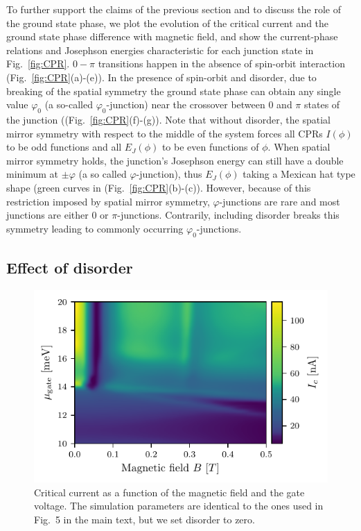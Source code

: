 To further support the claims of the previous section and to discuss the role of the ground state phase, we plot the evolution of the critical current and the ground state phase difference with magnetic field, and show the current-phase relations and Josephson energies characteristic for each junction state in Fig.~\ref{fig:CPR}.
$0-\pi$ transitions happen in the absence of spin-orbit interaction (Fig.~\ref{fig:CPR}(a)-(e)).
In the presence of spin-orbit and disorder, due to breaking of the spatial symmetry the ground state phase can obtain any single value $\varphi_0$ (a so-called $\varphi_0$-junction) near the crossover between $0$ and $\pi$ states of the junction ((Fig.~\ref{fig:CPR}(f)-(g)).
Note that without disorder, the spatial mirror symmetry with respect to the middle of the system forces all CPRs $I(\phi)$ to be odd functions and all $E_J(\phi)$ to be even functions of $\phi$.
When spatial mirror symmetry holds, the junction's Josephson energy can still have a double minimum at $\pm\varphi$ (a so called $\varphi$-junction), thus $E_J(\phi)$ taking a Mexican hat type shape (green curves in (Fig.~\ref{fig:CPR}(b)-(c)).
However, because of this restriction imposed by spatial mirror symmetry, $\varphi$-junctions are rare and most junctions are either 0 or $\pi$-junctions.
Contrarily, including disorder breaks this symmetry leading to commonly occurring $\varphi_0$-junctions.

\subsection{Effect of disorder}

\begin{figure}
\begin{center}
\centering
\includegraphics[width=0.7\columnwidth]{chapter_supercurrent/figures/sup_fig9.pdf}
\caption{Critical current as a function of the magnetic field and the gate voltage. The simulation parameters are identical to the ones used in Fig.~5 in the main text, but we set disorder to zero.\label{fig:gate_dependence}}
\end{center}
\end{figure}

